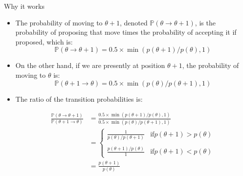 \documentclass[handout]{beamer}
\begin{document}
\begin{frame}{Why it works}
\scriptsize{

\begin{itemize}

\item The probability of moving to $\theta+ 1$, denoted
$\mathbb{P}(\theta \rightarrow \theta + 1)$, is the probability of proposing that move times the probability of
accepting it if proposed, which is:
\begin{displaymath}
\mathbb{P}(\theta \rightarrow \theta + 1) = 0.5 \times \min(p(\theta+ 1)/p(\theta),1)
\end{displaymath}

\item On the other hand, if we are presently at position $\theta+ 1$, the probability of moving to $\theta$ is:
\begin{displaymath}
\mathbb{P}(\theta+1 \rightarrow \theta) = 0.5 \times \min(p(\theta)/p(\theta+1),1)
\end{displaymath}

\item The ratio of the transition probabilities is:


   \begin{align}
\frac{\mathbb{P}(\theta \rightarrow \theta+1)}{\mathbb{P}(\theta +1 \rightarrow \theta)} & = \frac{0.5 \times \min(p(\theta+1)/p(\theta),1) }{0.5 \times \min(p(\theta)/p(\theta+1),1) }\\
& =     \begin{cases}
      \frac{1}{p(\theta)/p(\theta+1)} & \text{if} p(\theta+1) > p(\theta)\\ \\
      \frac{p(\theta+1)/p(\theta)}{1} & \text{if} p(\theta+1) < p(\theta)
    \end{cases} \\
 & =   \frac{p(\theta+1)}{p(\theta)}
 \end{align}


\end{itemize}


} 
\end{frame}
\end{document}
